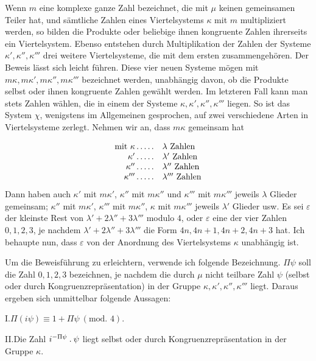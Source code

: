Wenn $m$ eine komplexe ganze Zahl bezeichnet, die mit $\mu$ keinen gemeinsamen Teiler hat, und sämtliche Zahlen eines Viertelsystems $\kappa$ mit $m$ multipliziert werden, so bilden die Produkte oder beliebige ihnen kongruente Zahlen ihrerseits ein Viertelsystem. Ebenso entstehen durch Multiplikation der Zahlen der Systeme $\kappa',\kappa'',\kappa'''$ drei weitere Viertelsysteme, die mit dem ersten zusammengehören. Der Beweis lässt sich leicht führen. Diese vier neuen Systeme mögen mit $m\kappa,m\kappa',m\kappa'',m\kappa'''$ bezeichnet werden, unabhängig davon, ob die Produkte selbst oder ihnen kongruente Zahlen gewählt werden. Im letzteren Fall kann man stets Zahlen wählen, die in einem der Systeme $\kappa,\kappa',\kappa'',\kappa'''$ liegen. So ist das System $\chi$, wenigstens im Allgemeinen gesprochen, auf zwei verschiedene Arten in Viertelsysteme zerlegt. Nehmen wir an, dass $m\kappa$ gemeinsam hat

\[
\begin{array}{rl}
\text{mit }\kappa\mathinner{.\,.\,.\,.\,.}&\lambda\text{ Zahlen}\\
\kappa'\mathinner{.\,.\,.\,.\,.}&\lambda'\text{ Zahlen}\\
\kappa''\mathinner{.\,.\,.\,.\,.}&\lambda''\text{ Zahlen}\\
\kappa'''\mathinner{.\,.\,.\,.\,.}&\lambda'''\text{ Zahlen}
\end{array}
\]
Dann haben auch $\kappa'$ mit $m\kappa'$, $\kappa''$ mit $m\kappa''$ und $\kappa'''$ mit $m\kappa'''$ jeweils $\lambda$ Glieder gemeinsam;
$\kappa''$ mit $m\kappa'$, $\kappa'''$ mit $m\kappa''$, $\kappa$ mit $m\kappa'''$ jeweils $\lambda'$ Glieder usw. Es sei $\varepsilon$ der kleinste Rest von $\lambda'+2\lambda''+3\lambda'''$ modulo $4$, oder $\varepsilon$ eine der vier Zahlen $0,1,2,3$, je nachdem $\lambda'+2\lambda''+3\lambda'''$ die Form $4n,4n+1,4n+2,4n+3$ hat. Ich behaupte nun, dass $\varepsilon$ von der Anordnung des Viertelsystems $\kappa$ unabhängig ist.

Um die Beweisführung zu erleichtern, verwende ich folgende Bezeichnung. $\Pi\psi$ soll die Zahl $0,1,2,3$ bezeichnen, je nachdem die durch $\mu$ nicht teilbare Zahl $\psi$ (selbst oder durch Kongruenzrepräsentation) in der Gruppe $\kappa,\kappa',\kappa'',\kappa'''$ liegt. Daraus ergeben sich unmittelbar folgende Aussagen:

I.\quad $\Pi(i\psi)\equiv1+\Pi\psi\ (\text{mod. }4)$.

II.\quad Die Zahl $i^{-\Pi\psi}\mathbin{.}\psi$ liegt selbst oder durch Kongruenzrepräsentation in der Gruppe $\kappa$.

